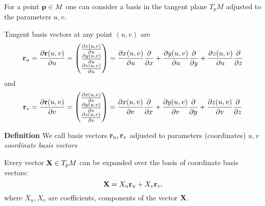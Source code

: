 \documentclass[12pt]{article}
\theoremstyle{theorem}
\numberwithin{equation}{section}
\begin{document}
For a point  ${\bf p}\in M$ one can consider a basis
in the tangent plane $T_pM$ adjusted to the parameters $u,v$.

       Tangent basis vectors at any point $(u,v)$
   are
              \begin{equation*}
                {\bf r}_u={\partial {\bf r}(u,v)\over \partial u}=\begin{pmatrix}
                              {\partial x(u,v)\over \partial u}\cr
                              {\partial y(u,v)\over \partial u}\cr
                              {\partial z(u,v)\over \partial u}\cr
                              \end{pmatrix}=
                              {\partial x(u,v)\over \partial u}{\partial\over \partial x}+
                              {\partial y(u,v)\over \partial u}{\partial\over \partial y}+
                              {\partial z(u,v)\over \partial u}{\partial\over \partial z}
              \end{equation*}
and            \begin{equation*}
                {\bf r}_v={\partial {\bf r}(u,v)\over \partial v}=\begin{pmatrix}
                              {\partial x(u,v)\over \partial v}\cr
                              {\partial y(u,v)\over \partial v}\cr
                              {\partial z(u,v)\over \partial v}\cr
                              \end{pmatrix}=
                              {\partial x(u,v)\over \partial v}{\partial\over \partial x}+
                              {\partial y(u,v)\over \partial v}{\partial\over \partial y}+
                              {\partial z(u,v)\over \partial v}{\partial\over \partial z}
              \end{equation*}

{\bf Definition}  We call basis vectors ${\bf r}_u,{\bf r}_v$
adjusted to parameters (coordinates) $u,v$ 
{\it coordinate basis vectors}



 Every vector ${\bf X}\in T_pM$
can be expanded over the basis of coordinate basis vectors:
\begin{equation*}\label{expansion}
  {\bf X}=X_u{\bf r}_u+X_v{\bf r}_v,
\end{equation*}
where $X_u, X_v$ are coefficients, components of the vector ${\bf X}$.
\end{document}
